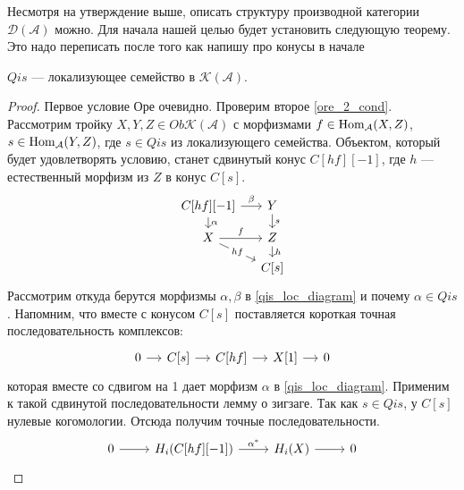 \documentclass[../main.tex]{subfiles}
\begin{document}
Несмотря на утверждение выше, описать структуру производной категории $\mathcal{D}(\mathcal{A})$ можно. Для начала нашей целью будет установить следующую теорему.
{\color{red} Это надо переписать после того как напишу про конусы в начале}
\begin{to_thr}
$Qis$ --- локализующее семейство в $\mathcal{K}(\mathcal{A})$.
\end{to_thr}
\begin{proof}
Первое условие Оре очевидно. Проверим второе \eqref{ore_2_cond}.
Рассмотрим тройку $X, Y, Z\in Ob\mathcal{K}(\mathcal{A})$ с морфизмами $f\in \operatorname{Hom}_\mathcal{A}(X, Z)$, $s\in \operatorname{Hom}_\mathcal{A}(Y, Z)$, где $s\in Qis$ из локализующего семейства. Объектом, который будет удовлетворять условию, станет сдвинутый конус $C[hf][-1]$, где $h$ --- естественный морфизм из $Z$ в конус $C[s]$.
    \begin{equation}\label{qis_loc_diagram}
        \begin{tikzcd}[sep=small]
	{C[hf][-1]} & Y \\
	X & {Z} \\
	& {C[s]}
	\arrow["s", from=1-2, to=2-2]
	\arrow["f", from=2-1, to=2-2]
	\arrow["h", from=2-2, to=3-2]
	\arrow["hf"{description}, from=2-1, to=3-2]
	\arrow["\alpha", from=1-1, to=2-1]
	\arrow["\beta", from=1-1, to=1-2]
\end{tikzcd}
\end{equation}
Рассмотрим откуда берутся морфизмы $\alpha, \beta$ в \eqref{qis_loc_diagram} и почему $\alpha \in Qis$.
Напомним, что вместе с конусом $C[s]$ поставляется короткая точная последовательность комплексов:
\begin{equation*}
        \begin{tikzcd}[sep=small]
	0&C[s] & {C[hf]} & {X[1]}&0
	\arrow[from=1-2, to=1-3]
	\arrow[from=1-3, to=1-4]
 \arrow[from=1-1, to=1-2]
 \arrow[from=1-4, to=1-5]
\end{tikzcd}
    \end{equation*}
    которая вместе со сдвигом на 1 дает морфизм $\alpha$ в \eqref{qis_loc_diagram}. Применим к такой сдвинутой последовательности лемму о зигзаге. Так как $s\in Qis$, у $C[s]$ нулевые когомологии. Отсюда получим точные последовательности.
    \begin{equation}\label{32_snake_lemma}
        \begin{tikzcd}
	0 & {H_i(C[hf][-1])} & {H_i(X)} & 0
	\arrow[from=1-1, to=1-2]
	\arrow["{\alpha^*}", from=1-2, to=1-3]
	\arrow[from=1-3, to=1-4]
\end{tikzcd}
    \end{equation}

\end{proof}
\end{document}
